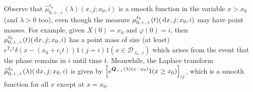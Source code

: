 Observe that \(\widehat \mu^{\ell_0}_{0,+,+}(\lambda)(x,j;x_0,i)\) is a smooth function in the variable \(x> x_0\) (and \(\lambda>0\) too), even though the measure \(\mu^{\ell_0}_{0,+,+}(t)(\, \mathrm{d} x,j;x_0,i)\) may have point masses. For example, given \(X(0)=x_0\) and \(\varphi(0)=i\), then \(\mu^{\ell_0}_{0,+,+}(t)(\, \mathrm{d} x,j;x_0,i)\) has a point mass of size (at least) \(e^{T_{ii}t}\delta(x-(x_0+c_it))1(j=i)1(x\in\mathcal D_{\ell_0,i})\) which arises from the event that the phase remains in \(i\) until time \(t\). Meanwhile, the Laplace transform \(\widehat \mu^{\ell_0}_{0,+,+}(\lambda)(\, \mathrm{d} x,j;x_0,i)\) is given by \(\displaystyle \left[e^{\boldsymbol Q_{++}(\lambda)(x-x_0)}1(x\geq x_0)\right]_{ij}\), which is a smooth function for all \(x\) except at \(x=x_0\). 


